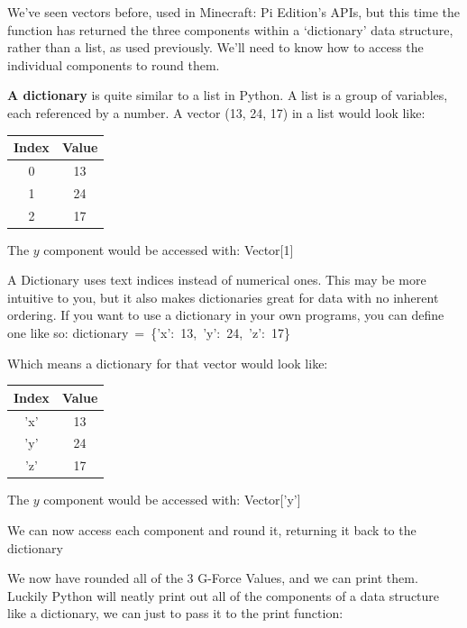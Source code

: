 \documentclass[a4paper, twocolumn, twoside, 12pt]{article}
\newenvironment{aside}
		{
		\begin{mdframed}[
			style=0,%
			leftline=false,
			rightline=false,
			innerbottommargin=2pt,
			innerleftmargin=12pt,
			innerrightmargin=0pt,
			linewidth=0.75pt,
			skipabove=6pt,
			skipbelow=6pt
			]
				\small
				\color{JungleGreen}
				\setlength{\parskip}{2pt}
				\vspace{2pt} %
		}
		{
		\end{mdframed}
		}
\begin{document}
			We've seen vectors before, used in Minecraft: Pi Edition's APIs, but this time the function has returned the three components within a `dictionary' data structure, rather than a list, as used previously. We'll need to know how to access the individual components to round them.
		
			\begin{aside}
				\textbf{A dictionary} is quite similar to a list in Python. A list is a group of variables, each referenced by a number. A vector (13, 24, 17) in a list would look like:
				
				\color{Black}
				\begin{tabular}{|c|c|}
					\hline Index & Value \\ 
					\hline 0 & 13 \\ 
					\hline 1 & 24 \\ 
					\hline 2 & 17 \\ 
					\hline 
				\end{tabular} 
				\color{JungleGreen}
				
				The $y$ component would be accessed with: \mbox{Vector[1]}
				
				A Dictionary uses text indices instead of numerical ones. This may be more intuitive to you, but it also makes dictionaries great for data with no inherent ordering. If you want to use a dictionary in your own programs, you can define one like so:
				\mbox{dictionary = \{'x': 13, 'y': 24, 'z': 17\}}
				
				Which means a dictionary for that vector would look like:

				\color{Black}
				\begin{tabular}{|c|c|}
					\hline Index & Value \\ 
					\hline 'x' & 13 \\ 
					\hline 'y' & 24 \\ 
					\hline 'z' & 17 \\ 
					\hline 
				\end{tabular}
				\color{JungleGreen}
				
				The $y$ component would be accessed with: \mbox{Vector['y']}	
			\end{aside}
			
			We can now access each component and round it, returning it back to the dictionary
			
			
			
			We now have rounded all of the 3 G-Force Values, and we can print them.
			Luckily Python will neatly print out all of the components of a data structure like a dictionary, we can just to pass it to the print function:
			
			
\end{document}
